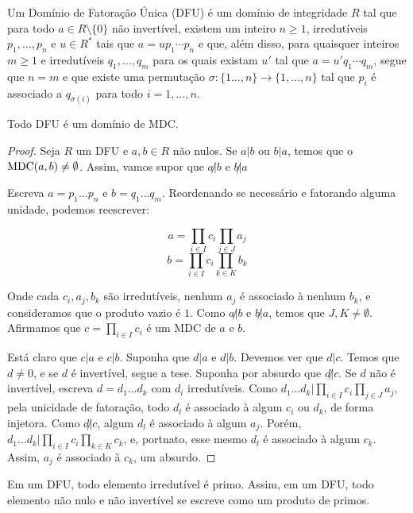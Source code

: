 \begin{definition}
    Um Domínio de Fatoração Única (DFU) é um domínio de integridade $R$ tal que para todo $a\in R\setminus \{0\}$ não invertível, existem um inteiro $n\geq 1$, irredutíveis $p_1, \dots, p_n$ e $u\in R^*$ tais que $a=up_1\cdots p_n$ e que, além disso, para quaisquer inteiros $m\geq 1$ e irredutíveis $q_1, \dots, q_m$ para os quais existam $u'$ tal que $a=u'q_1\cdots q_m$, segue que $n=m$ e que existe uma permutação $\sigma:\{1\dots, n\}\rightarrow \{1, \dots, n\}$ tal que $p_i$ é associado a $q_{\sigma(i)}$ para todo $i=1, \dots, n$.
\end{definition}

\begin{prop}
    Todo DFU é um domínio de MDC.
\end{prop}
\begin{proof}
Seja $R$ um DFU e $a, b \in R$ não nulos.
Se $a|b$ ou $b|a$, temos que o $\operatorname{MDC}(a, b)\neq \emptyset$.
Assim, vamos supor que $a\not|b$ e $b\not|a$

Escreva $a=p_1\dots p_n$ e $b=q_1\dots q_m$.
Reordenando se necessário e fatorando alguma unidade, podemos reescrever:

\[a=\prod_{i \in I} c_i \prod_{j \in J} a_j\]
\[b=\prod_{i \in I} c_i \prod_{k \in K} b_k\]

Onde cada $c_i, a_j, b_k$ são irredutíveis, nenhum $a_j$ é associado à nenhum $b_k$, e consideramos que o produto vazio é $1$.
Como $a\not |b$ e $b\not | a$, temos que $J, K\neq\emptyset$.
Afirmamos que $c=\prod_{i \in I} c_i$ é um MDC de $a$ e $b$.

Está claro que $c|a$ e $c|b$.
Suponha que $d|a$ e $d|b$.
Devemos ver que $d|c$.
Temos que $d\neq 0$, e se $d$ é invertível, segue a tese.
Suponha por absurdo que $d\not | c$.
Se $d$ não é invertível, escreva $d=d_1\dots d_k$ com $d_i$ irredutíveis.
Como $d_1\dots d_k|\prod_{i \in I} c_i \prod_{j \in J} a_j$, pela unicidade de fatoração, todo $d_l$ é associado à algum $c_i$ ou $d_k$, de forma injetora.
Como $d\not |c$, algum $d_l$ é associado à algum $a_j$.
Porém, $d_1\dots d_k|\prod_{i \in I} c_i \prod_{k \in K} c_k$, e, portnato, esse mesmo $d_l$ é associado à algum $c_k$.
Assim, $a_j$ é associado à $c_k$, um absurdo.
\end{proof}

\begin{corol}
Em um DFU, todo elemento irredutível é primo.
Assim, em um DFU, todo elemento não nulo e não invertível se escreve como um produto de primos.
\end{corol}

